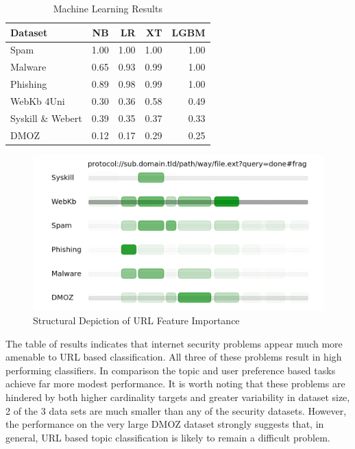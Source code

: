 \documentclass[sigconf]{acmart}
\begin{document}
\begin{table}
\caption{Machine Learning Results}
\label{tab:results}
\begin{tabular}{|l|r|r|r|r|}
\toprule
Dataset              &NB     &LR    &XT    &LGBM     \\
\midrule
Spam                 &1.00   &1.00  &1.00  &1.00     \\
Malware              &0.65   &0.93  &0.99  &1.00     \\
Phishing             &0.89   &0.98  &0.99  &1.00     \\
WebKb 4Uni           &0.30   &0.36  &0.58  &0.49     \\
Syskill \& Webert    &0.39   &0.35  &0.37  &0.33     \\
DMOZ                 &0.12   &0.17  &0.29  &0.25     \\
\bottomrule
\end{tabular}
\end{table}

\begin{figure}
\centering
\includegraphics[scale=0.8]{images/URL_importance.png}
\caption{Structural Depiction of URL Feature Importance}
\label{fig:importance}
\end{figure}

The table of results indicates that internet security problems appear much more amenable to URL based 
classification. All three of these problems result in high performing classifiers. In comparison the topic
and user preference based tasks achieve far more modest performance. It is worth noting that these problems 
are hindered by both higher cardinality targets and greater variability in dataset size, 2 of the 3 data 
sets are much smaller than any of the security datasets. However, the performance on the very large DMOZ
dataset strongly suggests that, in general, URL based topic classification is likely to remain a difficult
problem. 
\end{document}
